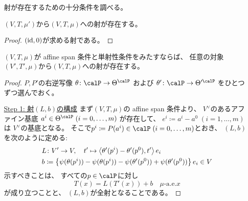 \documentclass[report]{jlreq}
\begin{document}
射が存在するための十分条件を調べる。

\begin{lemma}[基底測度だけを変化させた対象からの射]
    $(V, T, \mu')$から$(V, T, \mu)$への射が存在する。
\end{lemma}

\begin{proof}
    $(\mathrm{id}, 0)$が求める射である。
\end{proof}

\begin{lemma}[基底測度以外を変化させた対象からの射]
    $(V, T, \mu)$が affine span 条件と単射性条件をみたすならば、
    任意の対象$(V', T', \mu)$から$(V, T, \mu)$への射が存在する。
\end{lemma}

\begin{proof}
    $P, P'$の右逆写像
    $\theta \colon \calP \to \Theta^\calP$
    および
    $\theta' \colon \calP \to \Theta'^\calP$
    をひとつずつ選んでおく。

    \uline{Step 1: 射$(L, b)$の構成} \quad
    まず$(V, T, \mu)$の affine span 条件より、
    $V^\vee$のあるアファイン基底
    $a^i \in \Theta^\calP \; (i = 0, \dots, m)$
    が存在して、
    $e^i \coloneqq a^i - a^0 \; (i = 1, \dots, m)$は
    $V^\vee$の基底となる。
    そこで$p^i \coloneqq P(a^i) \in \calP \; (i = 0, \dots, m)$とおき、
    $(L, b)$を次のように定める:
    \begin{alignat}{1}
        &L \colon V' \to V,
            \quad
            t' \mapsto
                \left\langle{\theta'(p^i) - \theta'(p^0)},{t'}\right\rangle e_i
            \\
        &b \coloneqq
            \left\{{
                \psi(\theta(p^i)) - \psi(\theta(p^i))
                - \psi(\theta'(p^0)) + \psi(\theta'(p^0))
            }\right\} e_i
            \in V
    \end{alignat}
    示すべきことは、
    すべての$p \in \calP$に対し
    \begin{equation}
        T(x) = L(T'(x)) + b
            \quad
            \text{$\mu$-a.e.$x$}
    \end{equation}
    が成り立つことと、
    $(L, b)$が全射となることである。


\end{proof}
\end{document}

